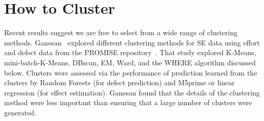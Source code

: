 \documentclass[conference]{IEEEtran}
\begin{document}
	\section{How to Cluster}
	Recent results suggest  we are free to select from a wide range of 
	clustering methods.  Ganesan~\cite{div14} explored 
	different clustering methods for SE data using   effort and defect data from
	the PROMISE repository~\cite{promiserepo}.
	That study explored
	K-Means, mini-batch-K-Means, DBscan, EM, Ward, and the WHERE algorithm discussed
	below.
	Clusters were assessed via the performance of prediction 
	learned from the clusters by Random Forests (for defect prediction)
	and M5prime or linear regression (for effect estimation).  Ganesan found
	that the details of the clustering method were less important than ensuring that  a large number of clusters were generated.
	
\end{document}
